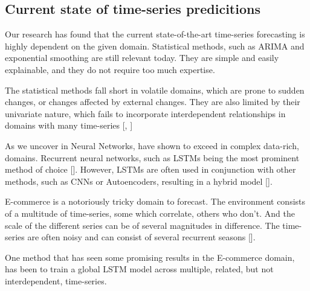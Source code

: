 \subsection{Current state of time-series predicitions}


Our research has found that the current state-of-the-art time-series forecasting is highly dependent
on the given domain. Statistical methods, such as ARIMA and exponential smoothing
are still relevant today. They are simple and easily explainable, and they do not require
too much expertise.

The statistical methods fall short in volatile domains, which are prone to sudden changes,
or changes affected by external changes. They are also limited by their univariate nature, which fails to
incorporate interdependent relationships in domains with many time-series [, ]

As we uncover in  Neural Networks, have shown to exceed in complex data-rich, domains. Recurrent neural networks, such as LSTMs being the most
prominent method of choice []. However, LSTMs are often used in conjunction with other methods, such as CNNs or Autoencoders,
resulting in a hybrid model [].

E-commerce is a notoriously tricky domain to forecast. The environment consists of a multitude of time-series,
some which correlate, others who don't. And the scale of the different series can be of several magnitudes in difference.
The time-series are often noisy and can consist of several recurrent seasons [].

One method that has seen some promising results in the E-commerce domain, has been to train a global LSTM model across multiple,
related, but not interdependent, time-series.


